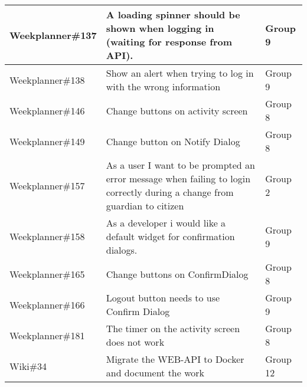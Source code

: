 \begin{longtable}{|p{2.9cm}|p{8cm}|p{2cm}|}
    Weekplanner\#137 & A loading spinner should be shown when logging in (waiting for response from API).                                                                                                    & Group 9            \\ \hline
    Weekplanner\#138 & Show an alert when trying to log in with the wrong information                                                                                                                         & Group 9           \\ \hline
    Weekplanner\#146 & Change buttons on activity screen                                                                                                                                                    & Group 8          \\ \hline
    Weekplanner\#149 & Change button on Notify Dialog                                                                                                                                                        & Group 8           \\ \hline
    Weekplanner\#157 & As a user I want to be prompted an error message when failing to login correctly during a change from guardian to citizen                                                             & Group 2            \\ \hline
    Weekplanner\#158 & As a developer i would like a default widget for confirmation dialogs.                                                                                                                  & Group 9           \\ \hline
    Weekplanner\#165 & Change buttons on ConfirmDialog                                                                                                                                                        & Group 8           \\ \hline
    Weekplanner\#166 & Logout button needs to use Confirm Dialog                                                                                                                                             & Group 9           \\ \hline
    Weekplanner\#181 & The timer on the activity screen does not work                                                                                                                                         & Group 8           \\ \hline
    Wiki\#34         & Migrate the WEB-API to Docker and document the work                                                                                                                                     & Group 12           \\ \hline

\end{longtable}
